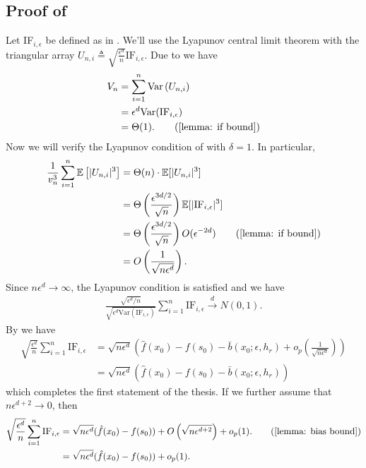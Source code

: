 \documentclass[11pt]{article}
\begin{document}
\subsection{Proof of } \label{sec: proof of f clt}
Let IF$_{i, \epsilon}$ be defined as in . We'll use the Lyapunov central limit theorem  with the triangular array $U_{n, i}\triangleq \sqrt{\frac{\epsilon^d}{n}}\text{IF}_{i, \epsilon}.$ Due to  we have
\begin{align*}
    V_n &= \sum_{i = 1}^n\text{Var}\left(U_{n, i}\right)\\ 
    &= \epsilon^d\text{Var}(\text{IF}_{i, \epsilon}) \\
    &= \Theta(1). \tag{\Cref{lemma: if bound}}
\end{align*}
Now we will verify the Lyapunov condition of  with $\delta = 1$. In particular,
\begin{align*}
    \frac{1}{v_n^{3}}\sum_{i = 1}^n \mathbb{E}\left[|U_{n, i}|^{3}\right] &= \Theta(n)\cdot \mathbb{E}[|U_{n, i}|^3] \\
    &= \Theta\left(\frac{\epsilon^{3d/2}}{\sqrt{n}}\right)\mathbb{E}[|\text{IF}_{i, \epsilon}|^3] \\
    &= \Theta\left(\frac{\epsilon^{3d/2}}{\sqrt{n}}\right)O(\epsilon^{-2d}) \tag{\Cref{lemma: if bound}} \\
    &= O\left(\frac{1}{\sqrt{n\epsilon^d}}\right).
\end{align*}
Since $n\epsilon^d \rightarrow \infty$, the Lyapunov condition is satisfied and we have
\begin{align*}
    \frac{\sqrt{\epsilon^d/n}}{\sqrt{\epsilon^d\text{Var}(\text{IF}_{i, \epsilon})}}\sum_{i = 1}^n\text{IF}_{i, \epsilon} \overset{d}{\rightarrow} N(0, 1).
\end{align*}
By  we have 
\begin{align*}
    \sqrt{\frac{\epsilon^d}{n}} \sum_{i = 1}^n\text{IF}_{i, \epsilon} &= \sqrt{n\epsilon^d}\left(\hat{f}(x_0) - f(s_0) - \bar{b}(x_0; \epsilon, h_r) + o_p\left(\frac{1}{\sqrt{n\epsilon^d}}\right)\right) \\
    &= \sqrt{n\epsilon^d}\left(\hat{f}(x_0) - f(s_0) - \bar{b}(x_0; \epsilon, h_r)\right)
\end{align*}
which completes the first statement of the thesis. If we further assume that $n\epsilon^{d+2} \rightarrow 0$, then
\begin{align*}
    \sqrt{\frac{\epsilon^d}{n}} \sum_{i = 1}^n\text{IF}_{i, \epsilon}&= \sqrt{n\epsilon^d}(\hat{f}(x_0) - f(s_0) )  + O\left(\sqrt{n\epsilon^{d+2}}\right) + o_p(1). \tag{\Cref{lemma: bias bound}} \\
    &= \sqrt{n\epsilon^d}(\hat{f}(x_0) - f(s_0) ) + o_p(1). 
\end{align*}
\end{document}
